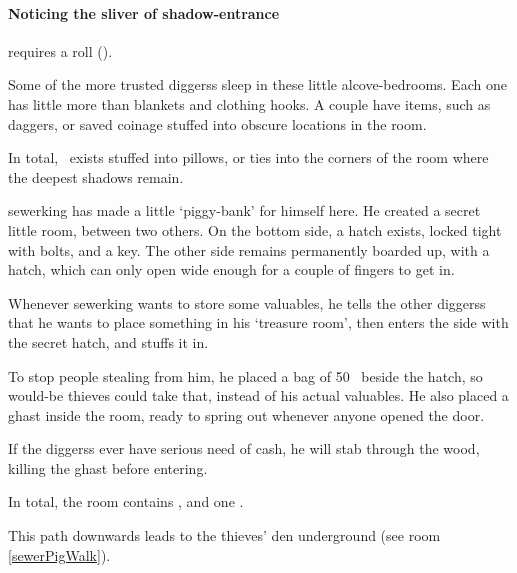 \begin{multicols}{2}
\begin{exampletext}
\end{exampletext}

\paragraph{Noticing the sliver of shadow-entrance}
requires a  roll (\tn[9]).


Some of the more trusted \glspl{diggers} sleep in these little alcove-bedrooms.
Each one has little more than blankets and clothing hooks.
A couple have items, such as daggers, or saved coinage stuffed into obscure locations in the room.

In total, \lootMedium\ exists stuffed into pillows, or ties into the corners of the room where the deepest shadows remain.


\Gls{sewerking} has made a little `piggy-bank' for himself here.
He created a secret little room, between two others.
On the bottom side, a hatch exists, locked tight with bolts, and a key.
The other side remains permanently boarded up, with a hatch, which can only open wide enough for a couple of fingers to get in.

Whenever \gls{sewerking} wants to store some valuables, he tells the other \glspl{diggers} that he wants to place something in his `treasure room', then enters the side with the secret hatch, and stuffs it in.

To stop people stealing from him, he placed a bag of 50~ beside the hatch, so would-be thieves could take that, instead of his actual valuables.
He also placed a ghast inside the room, ready to spring out whenever anyone opened the door.

If the \glspl{diggers} ever have serious need of cash, he will stab through the wood, killing the ghast before entering.


In total, the room contains \lootBig, and one \lootTalisman.

\showTalisman

This path downwards leads to the thieves' den underground (see room \vref{sewerPigWalk}).

\end{multicols}
